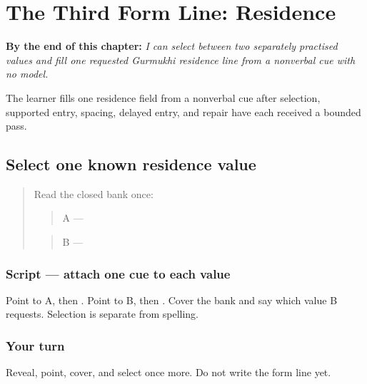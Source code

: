 
\chapter{The Third Form Line: Residence}
\label{ch:pa-form-residence}

\begin{chapteropening}
\textbf{By the end of this chapter:} \emph{I can select between two separately practised values and fill one requested Gurmukhi residence line from a nonverbal cue with no model.}

The learner fills one residence field from a nonverbal cue after selection, supported entry, spacing, delayed entry, and repair have each received a bounded pass.
\end{chapteropening}

\section[A / B (two residence-value cues)]{Select one known residence value}

\label{lesson:PA-W04-residence-select}



\begin{quote}
Read the closed bank once:

\begin{quote}
A — \textbf{}
\end{quote}

\begin{quote}
B — \textbf{}
\end{quote}
\end{quote}

\subsection*{Script — attach one cue to each value}
Point to A, then \textbf{}. Point to B, then \textbf{}. Cover the bank and say which value B requests. Selection is separate from spelling.

\subsection*{Your turn}
Reveal, point, cover, and select once more. Do not write the form line yet.


